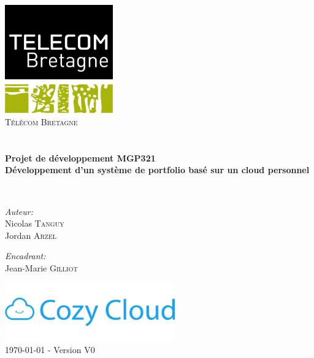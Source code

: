 \begin{titlepage}
\begin{center}

\includegraphics[width=0.35\textwidth]{./logotb}~\\[1cm]

\textsc{\LARGE Télécom Bretagne}\\[1.5cm]

\textsc{\Large }\\[0.5cm]

\HRule \\[0.4cm]

{\huge \bfseries Projet de développement MGP321\\
Développement d'un système de portfolio basé sur un cloud personnel \\[0.4cm] }

\HRule \\[1.5cm]

\begin{minipage}{0.4\textwidth}
\begin{flushleft} \large
\emph{Auteur:}\\
Nicolas \textsc{Tanguy}\\
Jordan \textsc{Arzel}\\


\end{flushleft}
\end{minipage}
\begin{minipage}{0.4\textwidth}
\begin{flushright} \large
\emph{Encadrant:} \\
Jean-Marie \textsc{Gilliot}\\

\end{flushright}
\end{minipage}

\vfill

\includegraphics[width=0.55\textwidth]{./cozy}~\\[2cm]

{\large \today}
- Version V0

\end{center}
\end{titlepage}